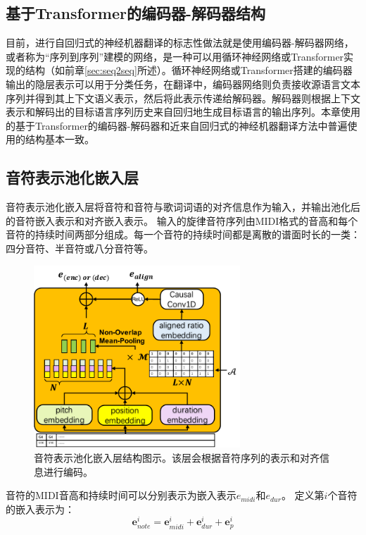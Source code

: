 \subsection{基于Transformer的编码器-解码器结构}
\label{sec:ast_transformer_enc_dec}
目前，进行自回归式的神经机器翻译的标志性做法就是使用编码器-解码器网络，或者称为``序列到序列''建模的网络，是一种可以用循环神经网络或Transformer实现的结构（如前章\ref{sec:seq2seq}所述）。循环神经网络或Transformer搭建的编码器输出的隐层表示可以用于分类任务，在翻译中，编码器网络则负责接收源语言文本序列并得到其上下文语义表示，然后将此表示传递给解码器。解码器则根据上下文表示和解码出的目标语言序列历史来自回归地生成目标语言的输出序列。本章使用的基于Transformer的编码器-解码器和近来自回归式的神经机器翻译方法中普遍使用的结构基本一致。
\label{sec:transformer_enc_dec}
\subsection{音符表示池化嵌入层}
\label{sec:note_pooling}
音符表示池化嵌入层将音符和音符与歌词词语的对齐信息作为输入，并输出池化后的音符嵌入表示和对齐嵌入表示。
输入的旋律音符序列由MIDI格式的音高和每个音符的持续时间两部分组成。每一个音符的持续时间都是离散的谱面时长的一类：四分音符、半音符或八分音符等。
\begin{figure}[t]
    \centering
    \includegraphics[width=0.69\textwidth,clip=true]{figure/ast/note-pooling.pdf}
    \caption{音符表示池化嵌入层结构图示。该层会根据音符序列的表示和对齐信息进行编码。}
    \label{fig:align_enc}
\end{figure}
音符的MIDI音高和持续时间可以分别表示为嵌入表示$e_{midi}$和$e_{dur}$。
定义第$i$个音符的嵌入表示为：
\begin{equation}
\label{eq:note}
    \mathbf{e}_{note}^i=\mathbf{e}_{midi}^i+\mathbf{e}_{dur}^i+\mathbf{e}_p^i
\end{equation}
